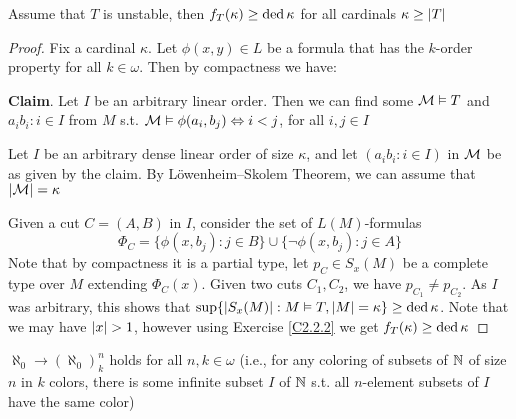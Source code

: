 \documentclass[11pt]{article}
\begin{document}
\begin{proposition}[]
\label{C2.2.8}
Assume that \(T\) is unstable, then \(f_T(\kappa)\ge\operatorname{ded}\kappa\) for all cardinals \(\kappa\ge\abs{T}\)
\end{proposition}

\begin{proof}
Fix a cardinal \(\kappa\). Let \(\phi(x,y)\in L\) be a formula that has the \(k\)-order property for
all \(k\in\omega\). Then by compactness we have:

\textbf{Claim}. Let \(I\) be an arbitrary linear order. Then we can find some \(\mathcal{M}\vDash T\) and \(a_ib_i:i\in I\)
 from \(M\) s.t. \(\mathcal{M}\vDash\phi(a_i,b_j)\Leftrightarrow i<j\), for all \(i,j\in I\)


Let \(I\) be an arbitrary dense linear order of size \(\kappa\), and let \((a_ib_i:i\in I)\) in \(\mathcal{M}\) be as
given by the claim. By Löwenheim–Skolem Theorem, we can assume that \(\abs{\calm}=\kappa\)

Given a cut \(C=(A,B)\) in \(I\), consider the set of \(L(M)\)-formulas
 \begin{equation*}
\Phi_C=\{\phi(x,b_j):j\in B\}\cup\{\neg\phi(x,b_j):j\in A\}
 \end{equation*}
Note that by compactness it is a partial type, let \(p_C\in S_x(M)\) be a complete type over \(M\)
extending \(\Phi_C(x)\). Given two cuts \(C_1,C_2\), we have \(p_{C_1}\neq p_{C_2}\). As \(I\) was
arbitrary, this shows that \(\sup\{\abs{S_x(M)}:M\vDash T,\abs{M}=\kappa\}\ge\ded\kappa\). Note that we may
have \(\abs{x}>1\), however using Exercise \ref{C2.2.2} we get \(f_T(\kappa)\ge\operatorname{ded}\kappa\)
\end{proof}

\begin{fact}[Ramsey]
\(\aleph_0\to(\aleph_0)^n_k\) holds for all \(n,k\in\omega\) (i.e., for any coloring of subsets of \(\mathbb{N}\) of size
\(n\) in \(k\) colors, there is some infinite subset \(I\) of \(\mathbb{N}\) s.t. all \(n\)-element
subsets of \(I\) have the same color)
\end{fact}
\end{document}
